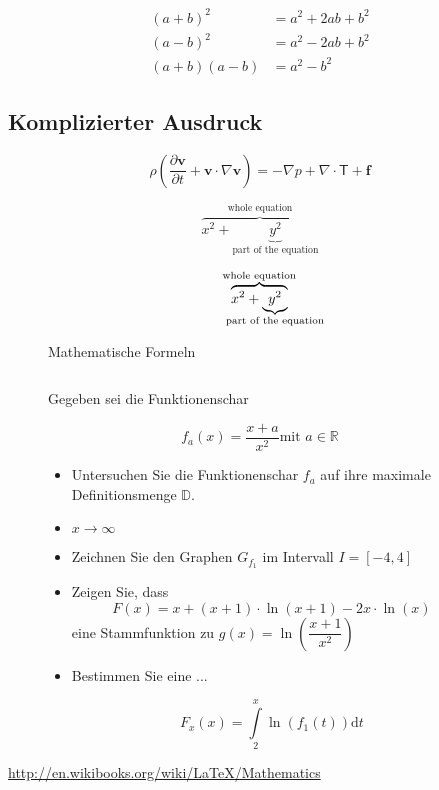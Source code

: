 \documentclass[10pt, a4paper]{article}
\numberwithin{equation}{section}
\numberwithin{figure}{section}
\begin{document}
\begin{align}
  (a+b)^2    &=    a^2+2ab+b^2 \nonumber \\
  (a-b)^2    &=    a^2-2ab+b^2 \nonumber \\
  (a+b)(a-b) &=    a^2-b^2
\end{align}

\subsection{Komplizierter Ausdruck}
\begin{figure}[h]
\[ \rho\left( \frac{\partial \mathbf{v}}{\partial t} + \mathbf{v}\cdot\nabla\mathbf{v}\right) = -\nabla p + \nabla\cdot\mathsf{T}+\mathbf{f} \]

\[ \overbrace{x^2 + \underbrace{y^2}_\text{part of the equation}}^\text{whole equation} \]

\[ \overbrace{x^2 + \underbrace{y^2}_{\mathclap{\text{part of the equation}}}}^{{\text{whole equation}}} \]
\caption{Mathematische Formeln}
\end{figure}

\begin{equation}
[]
\end{equation}

\begin{figure}
Gegeben sei die Funktionenschar

\[ f_a(x) = \frac{x+a}{x^2} \text{mit } a \in \mathbb{R} \]

\begin{itemize}
\item Untersuchen Sie die Funktionenschar \( f_a \) auf ihre maximale Definitionsmenge \( \mathbb{D} \).
\item \( x \to \infty \)
\item Zeichnen Sie den Graphen \( G_{f_1} \) im Intervall \( I = [-4,4] \)
\item Zeigen Sie, dass 
\[ F(x) = x+ (x+1)\cdot\ln(x+1)-2x\cdot\ln(x) \]
eine Stammfunktion zu \( g(x) = \ln\left(\dfrac{x+1}{x^2}\right) \)
\item Bestimmen Sie eine ...

\[ F_x(x) = \int\limits_2^x\ln\left(f_1(t)\right)\mathrm{d}t \]

\end{itemize}
\end{figure}

\url{http://en.wikibooks.org/wiki/LaTeX/Mathematics}
\end{document}
